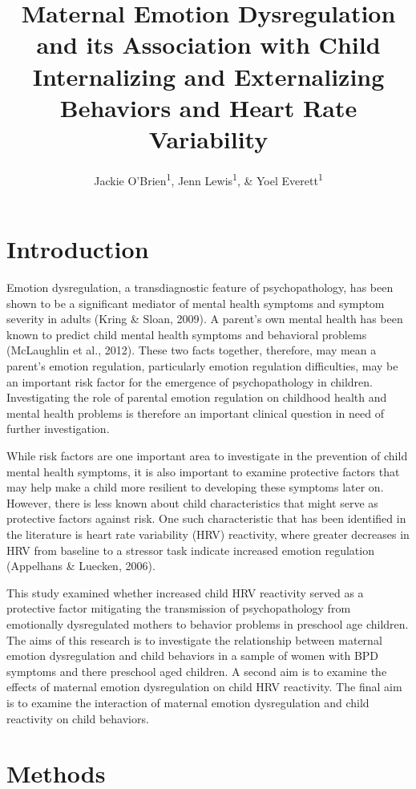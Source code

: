 \documentclass[man]{apa6}
\title{Maternal Emotion Dysregulation and its Association with Child
Internalizing and Externalizing Behaviors and Heart Rate Variability}
\author{Jackie O'Brien\textsuperscript{1}, Jenn Lewis\textsuperscript{1}, \&
Yoel Everett\textsuperscript{1}}
\date{}
\affiliation{
\vspace{0.5cm}
\textsuperscript{1} University of Oregon}
\begin{document}
\maketitle

\section{Introduction}\label{introduction}

Emotion dysregulation, a transdiagnostic feature of psychopathology, has
been shown to be a significant mediator of mental health symptoms and
symptom severity in adults (Kring \& Sloan, 2009). A parent's own mental
health has been known to predict child mental health symptoms and
behavioral problems (McLaughlin et al., 2012). These two facts together,
therefore, may mean a parent's emotion regulation, particularly emotion
regulation difficulties, may be an important risk factor for the
emergence of psychopathology in children. Investigating the role of
parental emotion regulation on childhood health and mental health
problems is therefore an important clinical question in need of further
investigation.

While risk factors are one important area to investigate in the
prevention of child mental health symptoms, it is also important to
examine protective factors that may help make a child more resilient to
developing these symptoms later on. However, there is less known about
child characteristics that might serve as protective factors against
risk. One such characteristic that has been identified in the literature
is heart rate variability (HRV) reactivity, where greater decreases in
HRV from baseline to a stressor task indicate increased emotion
regulation (Appelhans \& Luecken, 2006).

This study examined whether increased child HRV reactivity served as a
protective factor mitigating the transmission of psychopathology from
emotionally dysregulated mothers to behavior problems in preschool age
children. The aims of this research is to investigate the relationship
between maternal emotion dysregulation and child behaviors in a sample
of women with BPD symptoms and there preschool aged children. A second
aim is to examine the effects of maternal emotion dysregulation on child
HRV reactivity. The final aim is to examine the interaction of maternal
emotion dysregulation and child reactivity on child behaviors.

\section{Methods}\label{methods}
\end{document}
